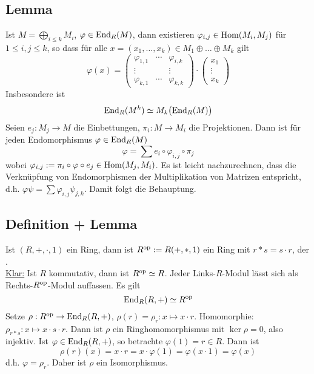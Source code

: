 \subsection[Lemma: Darstellung von $\varphi \in \End_R(M)$ als Matrix]{Lemma} %
\label{sub:227}
Ist $M = \bigoplus_{i \le k} M_i$, $\varphi \in \End_R(M)$, dann existieren $\varphi_{i,j} \in \Hom(M_i, M_j)$ für $1 \le i,j \le k$, so dass für alle 
$x = (x_1, \ldots , x_k) \in M_1 \oplus \ldots \oplus M_k$ gilt
\[
	\varphi(x) = \begin{pmatrix}
		\varphi_{1,1} & \cdots & \varphi_{i,k} \\
		\vdots & &\vdots \\
		\varphi_{k,1} & \cdots & \varphi_{k,k}
	\end{pmatrix}\cdot 
	\begin{pmatrix}
		x_1 \\ \vdots \\ x_k
	\end{pmatrix}
\]
Insbesondere ist 
\[
	\End_R(M^k) \simeq M_k \enbrace[\big]{\End_R(M)}
\]
Seien $e_j : M_j \to M$ die Einbettungen, $\pi_i : M \to M_i$ die Projektionen. Dann ist für jeden Endomorphismus $\varphi \in \End_R(M)$
\[
	\varphi = \sum e_i \circ \varphi_{i,j} \circ \pi_j
\]
wobei $\varphi_{i,j} := \pi_i \circ \varphi \circ e_j \in \Hom(M_j, M_i)$.
Es ist leicht nachzurechnen, dass die Verknüpfung von Endomorphismen der Multiplikation von Matrizen entspricht, d.h. $\varphi \psi = \sum \varphi_{i,j} \psi_{j,k}$. Damit
folgt die Behauptung. \bewende

\subsection[Definition: Entgegengesetzter Ring $R^{\op} \simeq \End_R(R,+)$]{Definition + Lemma} %
\label{sub:228}
Ist $(R,+,\cdot ,1)$ ein Ring, dann ist $R^{\op} := R(+, *, 1)$ ein Ring mit $r * s = s \cdot r$, der . \\
\uline{Klar:} Ist $R$ kommutativ, dann ist $R^{\op} \simeq R$. Jeder Links-$R$-Modul lässt sich als Rechts-$R^\op$-Modul auffassen.
Es gilt
\[
	\End_R(R,+) \simeq R^\op
\]
Setze $\rho : R^\op \to \End_R(R,+)$, $\rho(r)= \rho_r : x \mapsto x \cdot r$. Homomorphie: $\rho_{r * s} : x \mapsto x \cdot s \cdot r$. Dann ist $\rho$ ein
Ringhomomorphismus mit $\ker \rho = 0$, also injektiv. Ist $\varphi \in \End_R(R,+)$, so betrachte $\varphi(1)= r \in R$. Dann ist 
\[
	\rho(r)(x) = x \cdot r = x \cdot \varphi(1) = \varphi(x \cdot 1) = \varphi(x)
\]
d.h. $\varphi = \rho_r$. Daher ist $\rho$ ein Isomorphismus. \bewende

